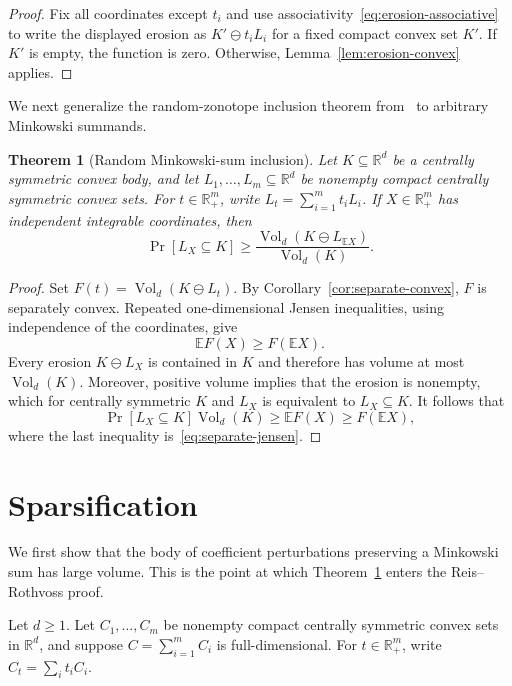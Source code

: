 \documentclass[11pt]{article}
\newtheorem{theorem}{Theorem}[section]
\theoremstyle{remark}
\newcommand{\R}{\mathbb{R}}
\newcommand{\E}{\mathbb{E}}
\newcommand{\Vol}{\operatorname{Vol}}
\newcommand{\MinkDiff}{\mathbin{\ominus}}
\begin{document}
\begin{proof}
Fix all coordinates except $t_i$ and use
associativity~\eqref{eq:erosion-associative} to write the displayed
erosion as $K'\MinkDiff t_iL_i$ for a fixed compact convex set $K'$.
If $K'$ is empty, the function is zero.  Otherwise,
Lemma~\ref{lem:erosion-convex} applies.
\end{proof}

We next generalize the random-zonotope inclusion theorem
from~\cite{RR26} to arbitrary Minkowski summands.

\begin{theorem}[Random Minkowski-sum inclusion]\label{thm:random-inclusion}
Let $K\subseteq\R^d$ be a centrally symmetric convex body, and let
$L_1,\ldots,L_m\subseteq\R^d$ be nonempty compact centrally symmetric
convex sets.  For $t\in\R_+^m$, write
$L_t=\sum_{i=1}^m t_iL_i$.  If $X\in\R_+^m$ has independent
integrable coordinates, then
\[
  \Pr[L_X\subseteq K]
  \geq
  \frac{\Vol_d(K\MinkDiff L_{\E X})}{\Vol_d(K)}.
\]
\end{theorem}

\begin{proof}
Set $F(t)=\Vol_d(K\MinkDiff L_t)$.  By
Corollary~\ref{cor:separate-convex}, $F$ is separately convex.  Repeated
one-dimensional Jensen inequalities, using independence of the
coordinates, give
\begin{equation}\label{eq:separate-jensen}
  \E F(X)\geq F(\E X).
\end{equation}
Every erosion $K\MinkDiff L_X$ is contained in $K$ and therefore has
volume at most $\Vol_d(K)$.  Moreover, positive volume implies that the
erosion is nonempty, which for centrally symmetric $K$ and $L_X$ is
equivalent to $L_X\subseteq K$.  It follows that
\[
  \Pr[L_X\subseteq K]\Vol_d(K)
  \geq \E F(X)
  \geq F(\E X),
\]
where the last inequality is~\eqref{eq:separate-jensen}.
\end{proof}

\section{Sparsification}\label{sec:proof}

We first show that the body of coefficient perturbations preserving a
Minkowski sum has large volume.  This is the point at which
Theorem~\ref{thm:random-inclusion} enters the Reis--Rothvoss proof.

Let $d\geq1$.  Let $C_1,\ldots,C_m$ be nonempty compact centrally
symmetric convex sets in $\R^d$, and suppose
$C=\sum_{i=1}^m C_i$ is full-dimensional.  For $t\in\R_+^m$, write
$C_t=\sum_i t_iC_i$.
\end{document}
